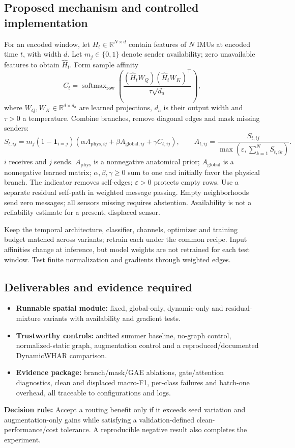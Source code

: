 \documentclass[10pt]{article}
\begin{document}
\subsection*{Proposed mechanism and controlled implementation}
For an encoded window, let $H_t\in\mathbb{R}^{N\times d}$ contain features of $N$ IMUs at encoded time $t$, with width $d$. Let $m_j\in\{0,1\}$ denote sender availability; zero unavailable features to obtain $\widehat H_t$. Form sample affinity
\[
C_t=\operatorname{softmax}_{\mathrm{row}}
\left(\frac{(\widehat H_tW_Q)(\widehat H_tW_K)^{\top}}{\tau\sqrt{d_a}}\right),
\]
where $W_Q,W_K\in\mathbb{R}^{d\times d_a}$ are learned projections, $d_a$ is their output width and $\tau>0$ a temperature. Combine branches, remove diagonal edges and mask missing senders:
\[
S_{t,ij}=m_j(1-\mathbf{1}_{i=j})
\left(\alpha A_{\mathrm{phys},ij}+\beta A_{\mathrm{global},ij}+\gamma C_{t,ij}\right),
\qquad
A_{t,ij}=\frac{S_{t,ij}}{\max\!\left(\varepsilon,\sum_{k=1}^{N}S_{t,ik}\right)}.
\]
$i$ receives and $j$ sends. $A_{\mathrm{phys}}$ is a nonnegative anatomical prior; $A_{\mathrm{global}}$ is a nonnegative learned matrix; $\alpha,\beta,\gamma\geq0$ sum to one and initially favor the physical branch. The indicator removes self-edges; $\varepsilon>0$ protects empty rows. Use a separate residual self-path in weighted message passing. Empty neighborhoods send zero messages; all sensors missing requires abstention. Availability is not a reliability estimate for a present, displaced sensor.

Keep the temporal architecture, classifier, channels, optimizer and training budget matched across variants; retrain each under the common recipe. Input affinities change at inference, but model weights are not retrained for each test window. Test finite normalization and gradients through weighted edges.

\subsection*{Deliverables and evidence required}
\begin{itemize}
\item \textbf{Runnable spatial module:} fixed, global-only, dynamic-only and residual-mixture variants with availability and gradient tests.
\item \textbf{Trustworthy controls:} audited summer baseline, no-graph control, normalized-static graph, augmentation control and a reproduced/documented DynamicWHAR comparison.
\item \textbf{Evidence package:} branch/mask/GAE ablations, gate/attention diagnostics, clean and displaced macro-F1, per-class failures and batch-one overhead, all traceable to configurations and logs.
\end{itemize}
\textbf{Decision rule:} Accept a routing benefit only if it exceeds seed variation and augmentation-only gains while satisfying a validation-defined clean-performance/cost tolerance. A reproducible negative result also completes the experiment.
\end{document}
